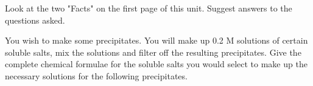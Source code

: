 \documentclass[fleqn]{exam}
\begin{document}
\begin{questions}

  \question Look at the two "Facts" on the first page of this unit. Suggest answers to the questions asked.
  \vspace{1.25in}

  \question You wish to make some precipitates. You will make up 0.2 M solutions of certain soluble salts, mix the solutions and filter off the resulting precipitates. Give the complete chemical formulae for the soluble salts you would select to make up the necessary solutions for the following precipitates.
\end{questions}
\end{document}
